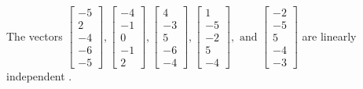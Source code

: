 \begin{exercise}
\begin{exerciseStatement}
  \end{exerciseStatement}
  \begin{exerciseAnswer}
   The vectors \(\left[\begin{array}{r}
-5 \\
2 \\
-4 \\
-6 \\
-5
\end{array}\right] , \left[\begin{array}{r}
-4 \\
-1 \\
0 \\
-1 \\
2
\end{array}\right] , \left[\begin{array}{r}
4 \\
-3 \\
5 \\
-6 \\
-4
\end{array}\right] , \left[\begin{array}{r}
1 \\
-5 \\
-2 \\
5 \\
-4
\end{array}\right] , \text{ and } \left[\begin{array}{r}
-2 \\
-5 \\
5 \\
-4 \\
-3
\end{array}\right]\) are 
  	 linearly independent  .
  


  \end{exerciseAnswer}
\end{exercise}